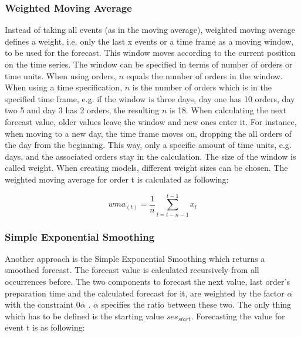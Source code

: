 \subsubsection{Weighted Moving Average}\label{subsubsection:Weighted Moving Average}
Instead of taking all events (as in the moving average), weighted moving average defines a weight, i.e. only the last x events or a time frame  as a moving window, to be used for the forecast. This window moves according to the current position on the time series. The window can be specified in terms of number of orders or time units. When using orders, $n$ equals the number of orders in the window. When using a time specification, $n$ is the number of orders which is in the specified time frame, e.g. if the window is three days, day one has 10 orders, day two 5 and day 3 has 2 orders, the resulting $n$ is 18. When calculating the next forecast value, older values leave the window and new ones enter it. For instance, when moving to a new day, the time frame moves on, dropping the all orders of the day from the beginning. This way, only a specific amount of time units, e.g. days, and the associated orders stay in the calculation. The size of the window is called weight. When creating models, different weight sizes can be chosen.\newline
The weighted moving average for order t is calculated as following:

\begin{center}
\begin{equation}
wma_{(t)}= \frac{1}{n}\sum^{t-1}_{l = t-n-1} x_{l}
\end{equation}
\end{center}

\subsubsection{Simple Exponential Smoothing}\label{subsubsection:Simple Exponential Smoothing}
Another approach is the Simple Exponential Smoothing which returns a smoothed forecast. The forecast value is calculated recursively from all occurrences before. The two components to forecast the next value, last order's preparation time and the calculated forecast for it, are weighted by the factor $\alpha$ with the constraint 0\le $\alpha$ . $\alpha$ specifies the ratio between these two. The only thing which has to be defined is the starting value $ses_{start}$.\newline
Forecasting the value for event t is as following:

